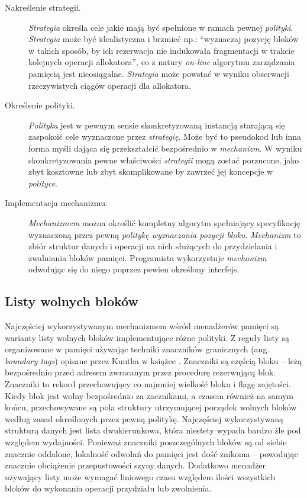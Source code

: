 \documentclass[12pt,a4paper,titlepage,twoside]{mwart}
\begin{document}
\begin{description}

\item[Nakreślenie strategii.] \textit{Strategia} określa cele jakie mają być
spełnione w ramach pewnej \textit{polityki}. \textit{Strategia} może być
idealistyczna i brzmieć np.: ``wyznaczaj pozycję bloków w takich sposób, by ich
rezerwacja nie indukowała fragmentacji w trakcie kolejnych operacji
allokatora'', co z natury \textit{on-line} algorytmu zarządzania pamięcią jest
nieosiągalne.  \textit{Strategia} może powstać w wyniku obserwacji
rzeczywistych ciągów operacji dla allokatora.

\item[Określenie polityki.] \textit{Polityka} jest w pewnym sensie
skonkretyzowaną instancją starającą się zaspokoić cele wyznaczone przez
\textit{strategię}. Może być to pseudokod lub inna forma myśli dająca się
przekształcić bezpośrednio w \textit{mechanizm}. W wyniku skonkretyzowania
pewne właściwości \textit{strategii} mogą zostać porzucone, jako zbyt kosztowne
lub zbyt skomplikowane by zawrzeć jej koncepcje w \textit{polityce}.

\item[Implementacja mechanizmu.] \textit{Mechanizmem} można określić kompletny
algorytm spełniający specyfikację wyznaczoną przez pewną \textit{politykę
wyznaczania pozycji bloku}. \textit{Mechanizm} to zbiór struktur danych i
operacji na nich służących do przydzielania i zwalniania bloków pamięci.
Programista wykorzystuje \textit{mechanizm} odwołując się do niego poprzez
pewien określony interfejs.

\end{description}

\subsection{Listy wolnych bloków}

Najczęściej wykorzystywanym mechanizmem wśród menadżerów pamięci są warianty
listy wolnych bloków implementujące różne polityki. Z reguły listy są
organizowane w pamięci używając techniki znaczników granicznych (ang.
\textit{boundary tags}) opisane przez Kuntha w książce
\cite{knuth73fundamental}. Znaczniki są częścią bloku -- leżą bezpośrednio
przed adresem zwracanym przez procedurę rezerwującą blok. Znaczniki to rekord
przechowujący co najmniej wielkość bloku i flagę zajętości. Kiedy blok jest
wolny bezpośrednio za zacznikami, a czasem również na samym końcu,
przechowywane są pola struktury utrzymującej porządek wolnych bloków według
zasad określonych przez pewną politykę. Najczęściej wykorzystywaną strukturą
danych jest lista dwukierunkowa, która niestety wypada bardzo źle pod względem
wydajności. Ponieważ znaczniki poszczególnych bloków są od siebie znacznie
oddalone, lokalność odwołań do pamięci jest dość znikoma -- powodując znacznie
obciążenie przepustowości szyny danych. Dodatkowo menadżer używający listy może
wymagać liniowego czasu względem ilości wszystkich bloków do wykonania operacji
przydziału lub zwolnienia.
\end{document}
